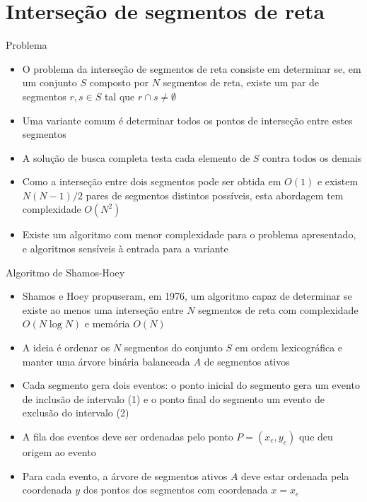 \section{Interseção de segmentos de reta}

\begin{frame}[fragile]{Problema}

    \begin{itemize}
        \item O problema da interseção de segmentos de reta consiste em determinar se, em um 
            conjunto $S$ composto por $N$ segmentos de reta, existe um par de segmentos 
            $r,s \in S$ tal que $r\cap s \neq \emptyset$

        \item Uma variante comum é determinar todos os pontos de interseção entre estes
            segmentos

        \item A solução de busca completa testa cada elemento de $S$ contra todos os demais

        \item Como a interseção entre dois segmentos pode ser obtida em $O(1)$ e existem
            $N(N - 1)/2$ pares de segmentos distintos possíveis, esta abordagem tem
            complexidade $O(N^2)$

        \item Existe um algoritmo com menor complexidade para o problema apresentado, e algoritmos 
            sensíveis à entrada para a variante
    \end{itemize}

\end{frame}

\begin{frame}[fragile]{Algoritmo de Shamos-Hoey}

    \begin{itemize}
        \item Shamos e Hoey propuseram, em 1976, um algoritmo capaz de determinar se existe ao
            menos uma interseção entre $N$ segmentos de reta com complexidade $O(N\log N)$ e
            memória $O(N)$

        \item A ideia é ordenar os $N$ segmentos do conjunto $S$ em ordem lexicográfica e manter
            uma árvore binária balanceada $A$ de segmentos ativos

        \item Cada segmento gera dois eventos: o ponto inicial do segmento gera um evento de 
            inclusão de intervalo (1) e o ponto final do segmento um evento de exclusão do 
            intervalo (2)

        \item A fila dos eventos deve ser ordenadas pelo ponto $P = (x_e, y_e)$ que deu origem 
            ao evento

        \item Para cada evento, a árvore de segmentos ativos $A$ deve estar ordenada pela 
            coordenada $y$ dos pontos dos segmentos com coordenada $x = x_e$ 
    \end{itemize}

\end{frame}

